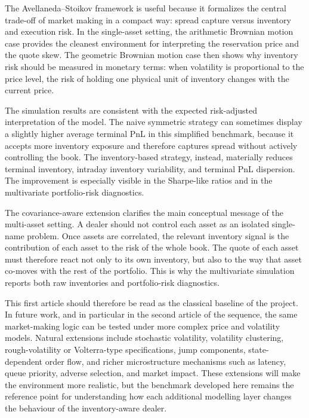 \documentclass[a4paper,10pt,titlepage,oneside,openany]{book}
\theoremstyle{plain}\newtheorem{theorem}{Theorem}[chapter]
\theoremstyle{definition}\newtheorem{definition}{Definition}[chapter]
\theoremstyle{remark}\newtheorem{remark}{Remark}[chapter]
\begin{document}
The Avellaneda--Stoikov framework is useful because it formalizes the central trade-off of market making in a compact way: spread capture versus inventory and execution risk. In the single-asset setting, the arithmetic Brownian motion case provides the cleanest environment for interpreting the reservation price and the quote skew. The geometric Brownian motion case then shows why inventory risk should be measured in monetary terms: when volatility is proportional to the price level, the risk of holding one physical unit of inventory changes with the current price.

The simulation results are consistent with the expected risk-adjusted interpretation of the model. The naive symmetric strategy can sometimes display a slightly higher average terminal PnL in this simplified benchmark, because it accepts more inventory exposure and therefore captures spread without actively controlling the book. The inventory-based strategy, instead, materially reduces terminal inventory, intraday inventory variability, and terminal PnL dispersion. The improvement is especially visible in the Sharpe-like ratios and in the multivariate portfolio-risk diagnostics.

The covariance-aware extension clarifies the main conceptual message of the multi-asset setting. A dealer should not control each asset as an isolated single-name problem. Once assets are correlated, the relevant inventory signal is the contribution of each asset to the risk of the whole book. The quote of each asset must therefore react not only to its own inventory, but also to the way that asset co-moves with the rest of the portfolio. This is why the multivariate simulation reports both raw inventories and portfolio-risk diagnostics.

This first article should therefore be read as the classical baseline of the project. In future work, and in particular in the second article of the sequence, the same market-making logic can be tested under more complex price and volatility models. Natural extensions include stochastic volatility, volatility clustering, rough-volatility or Volterra-type specifications, jump components, state-dependent order flow, and richer microstructure mechanisms such as latency, queue priority, adverse selection, and market impact. These extensions will make the environment more realistic, but the benchmark developed here remains the reference point for understanding how each additional modelling layer changes the behaviour of the inventory-aware dealer.
\end{document}
